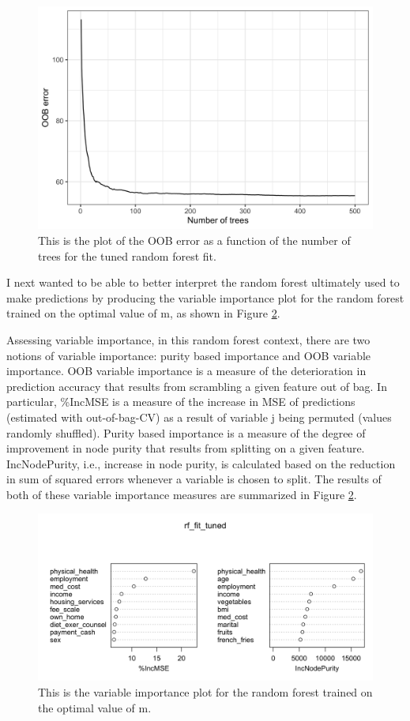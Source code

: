 \documentclass[
]{article}
\begin{document}
\begin{figure}[H]

{\centering \includegraphics[width=0.65\linewidth]{../results/oob-error-vs-ntrees-plot} 

}

\caption{This is the plot of the OOB error as a function of the number of trees for the tuned random forest fit.}\label{fig:oob-error-vs-ntrees-plot}
\end{figure}

I next wanted to be able to better interpret the random forest ultimately used to make predictions by producing the variable importance plot for the random forest trained on the optimal value of m, as shown in Figure \ref{fig:rf-var-importance-plot}.

Assessing variable importance, in this random forest context, there are two notions of variable importance: purity based importance and OOB variable importance. OOB variable importance is a measure of the deterioration in prediction accuracy that results from scrambling a given feature out of bag. In particular, \%IncMSE is a measure of the increase in MSE of predictions (estimated with out-of-bag-CV) as a result of variable j being permuted (values randomly shuffled). Purity based importance is a measure of the degree of improvement in node purity that results from splitting on a given feature. IncNodePurity, i.e., increase in node purity, is calculated based on the reduction in sum of squared errors whenever a variable is chosen to split. The results of both of these variable importance measures are summarized in Figure \ref{fig:rf-var-importance-plot}.

\begin{figure}[H]

{\centering \includegraphics[width=0.75\linewidth]{../results/rf-var-importance-plot} 

}

\caption{This is the variable importance plot for the random forest trained on the optimal value of m.}\label{fig:rf-var-importance-plot}
\end{figure}
\end{document}
